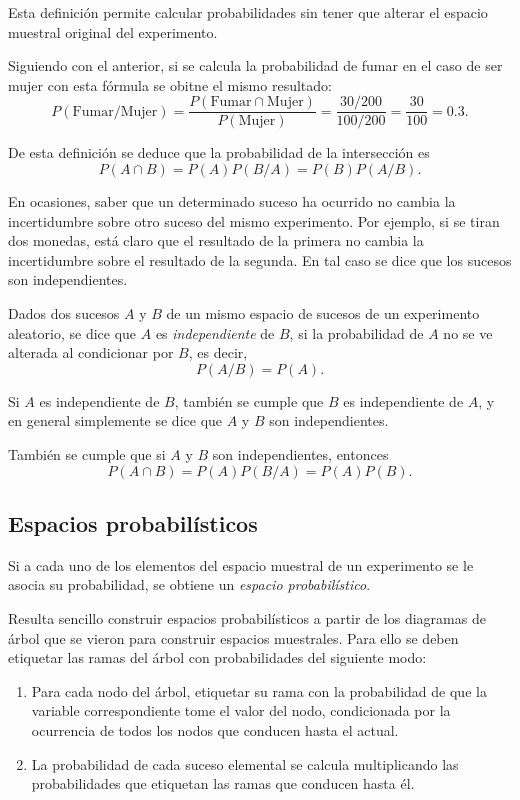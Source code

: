 Esta definición permite calcular probabilidades sin tener que alterar el espacio muestral original del experimento.

\begin{ejemplo}
Siguiendo con el anterior, si se calcula la probabilidad de fumar en el caso de ser mujer con esta fórmula se obitne el mismo resultado:
\[P(\mbox{Fumar}/\mbox{Mujer})= \frac{P(\mbox{Fumar}\cap \mbox{Mujer})}{P(\mbox{Mujer})} = \frac{30/200}{100/200}=\frac{30}{100}=0.3.\]
\end{ejemplo}

De esta definición se deduce que la probabilidad de la intersección es
\[ P(A\cap B) = P(A)P(B/A) = P(B)P(A/B).\]

En ocasiones, saber que un determinado suceso ha ocurrido no cambia la incertidumbre sobre otro suceso del mismo experimento. 
Por ejemplo, si se tiran dos monedas, está claro que el resultado de la primera no cambia la incertidumbre sobre el resultado de la segunda.
En tal caso se dice que los sucesos son independientes.

\begin{definicion}
Dados dos sucesos $A$ y $B$ de un mismo espacio de sucesos de un experimento aleatorio, se dice que $A$ es \emph{independiente} de $B$, si
la probabilidad de $A$ no se ve alterada al condicionar por $B$, es decir,
\[ P(A/B) = P(A).\]
\end{definicion}

Si $A$ es independiente de $B$, también se cumple que $B$ es independiente de $A$, y en general simplemente se dice que $A$ y $B$ son
independientes.

También se cumple que si $A$ y $B$ son independientes, entonces 
\[ P(A\cap B) = P(A)P(B/A) = P(A)P(B). \]


\subsection{Espacios probabilísticos}
Si a cada uno de los elementos del espacio muestral de un experimento se le asocia su probabilidad, se obtiene un \emph{espacio
probabilístico}.

Resulta sencillo construir espacios probabilísticos a partir de los diagramas de árbol que se vieron para construir espacios muestrales. 
Para ello se deben etiquetar las ramas del árbol con probabilidades del siguiente modo: 
\begin{enumerate}
\item Para cada nodo del árbol, etiquetar su rama con la probabilidad de que la variable correspondiente tome el valor del nodo,
condicionada por la ocurrencia de todos los nodos que conducen hasta el actual.
\item La probabilidad de cada suceso elemental se calcula multiplicando las probabilidades que etiquetan las ramas que
conducen hasta él.
\end{enumerate}


